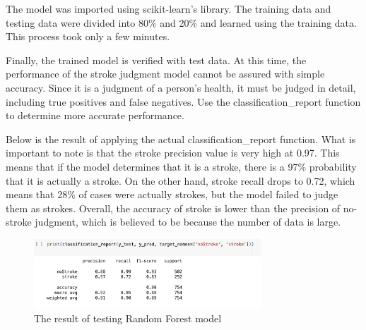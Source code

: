 The model was imported using scikit-learn’s library. The training data and testing data were divided into 80\% and 20\% and learned using the training data. This process took only a few minutes.

Finally, the trained model is verified with test data. At this time, the performance of the stroke judgment model cannot be assured with simple accuracy. Since it is a judgment of a person's health, it must be judged in detail, including true positives and false negatives. Use the classification\_report function to determine more accurate performance.

Below is the result of applying the actual classification\_report function. What is important to note is that the stroke precision value is very high at 0.97. This means that if the model determines that it is a stroke, there is a 97\% probability that it is actually a stroke. On the other hand, stroke recall drops to 0.72, which means that 28\% of cases were actually strokes, but the model failed to judge them as strokes. Overall, the accuracy of stroke is lower than the precision of no-stroke judgment, which is believed to be because the number of data is large.
\begin{figure}[h]
    \centering
    \includegraphics[width=8.5cm]{images/rf_result.png}
    \caption{The result of testing Random Forest model}
    \label{fig:enter-label}
\end{figure}


